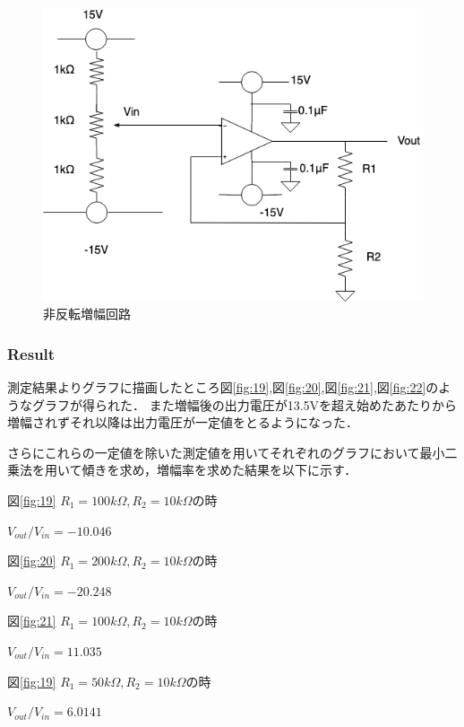 \documentclass[11pt, a4paper,twocolumn]{jarticle}
\begin{document}
\begin{figure}[htbp]
 \begin{center}
  \includegraphics[width=0.8\linewidth]{fig11.png}
 \end{center}
 \caption{非反転増幅回路}
 \label{fig:11}
\end{figure}
\newpage

\subsubsection{Result}
測定結果よりグラフに描画したところ図\ref{fig:19},図\ref{fig:20},図\ref{fig:21},図\ref{fig:22}のようなグラフが得られた．
また増幅後の出力電圧が13.5Vを超え始めたあたりから増幅されずそれ以降は出力電圧が一定値をとるようになった．

さらにこれらの一定値を除いた測定値を用いてそれぞれのグラフにおいて最小二乗法を用いて傾きを求め，増幅率を求めた結果を以下に示す．

図\ref{fig:19} $R_1=100k\Omega,R_2=10k\Omega$の時　

$V_{out}/V_{in}=-10.046$

図\ref{fig:20} $R_1=200k\Omega,R_2=10k\Omega$の時　

$V_{out}/V_{in}=-20.248$

図\ref{fig:21} $R_1=100k\Omega,R_2=10k\Omega$の時　

$V_{out}/V_{in}=11.035$

図\ref{fig:19} $R_1=50k\Omega,R_2=10k\Omega$の時　

$V_{out}/V_{in}=6.0141$

\newpage
\end{document}
